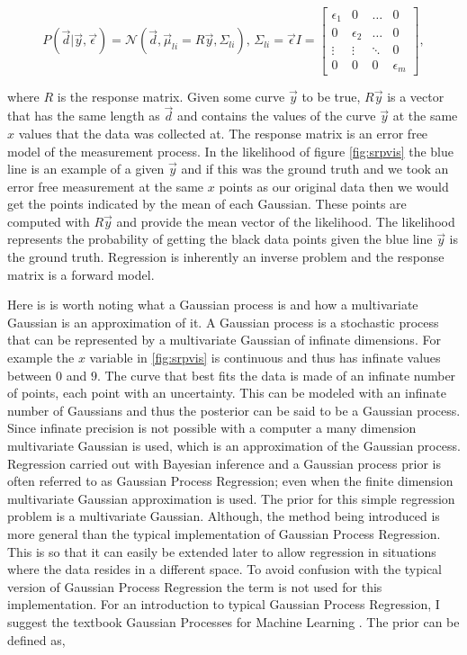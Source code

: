\begin{equation}
  P(\vec{d}|\vec{y},\vec \epsilon) = \mathcal{N}(\vec{d}, \vec \mu_{li} = R\vec{y}, \Sigma_{li}),\, \Sigma_{li} = \vec{\epsilon}I = 
    \begin{bmatrix}
        \epsilon_1 & 0 & \hdots & 0\\
        0 & \epsilon_2 & \hdots & 0\\
        \vdots & \vdots & \ddots & 0 \\
        0 & 0 & 0 &\epsilon_m
    \end{bmatrix},
  \label{eq:likelihood}
\end{equation}

\noindent where $R$ is the response matrix. Given some curve $\vec y$ to be true, $R \vec y$ is a vector that has the same length as $\vec d$ and contains the values of the curve $\vec y$ at the same $x$ values that the data was collected at. The response matrix is an error free model of the measurement process. In the likelihood of figure \ref{fig:srpvis} the blue line is an example of a given $\vec{y}$ and if this was the ground truth and we took an error free measurement at the same $x$ points as our original data then we would get the points indicated by the mean of each Gaussian. These points are computed with $R\vec y$ and provide the mean vector of the likelihood. The likelihood represents the probability of getting the black data points given the blue line $\vec y$ is the ground truth. Regression is inherently an inverse problem and the response matrix is a forward model. 

Here is is worth noting what a Gaussian process is and how a multivariate Gaussian is an approximation of it. A Gaussian process is a stochastic process that can be represented by a multivariate Gaussian of infinate dimensions. For example the $x$ variable in \ref{fig:srpvis} is continuous and thus has infinate values between $0$ and $9$. The curve that best fits the data is made of an infinate number of points, each point with an uncertainty. This can be modeled with an infinate number of Gaussians and thus the posterior can be said to be a Gaussian process. Since infinate precision is not possible with a computer a many dimension multivariate Gaussian is used, which is an approximation of the Gaussian process. Regression carried out with Bayesian inference and a Gaussian process prior is often referred to as Gaussian Process Regression; even when the finite dimension multivariate Gaussian approximation is used. The prior for this simple regression problem is a multivariate Gaussian. Although, the method being introduced is more general than the typical implementation of Gaussian Process Regression. This is so that it can easily be extended later to allow regression in situations where the data resides in a different space. To avoid confusion with the typical version of Gaussian Process Regression the term is not used for this implementation. For an introduction to typical Gaussian Process Regression, I suggest the textbook Gaussian Processes for Machine Learning \cite{gp4ml}. The prior can be defined as,

